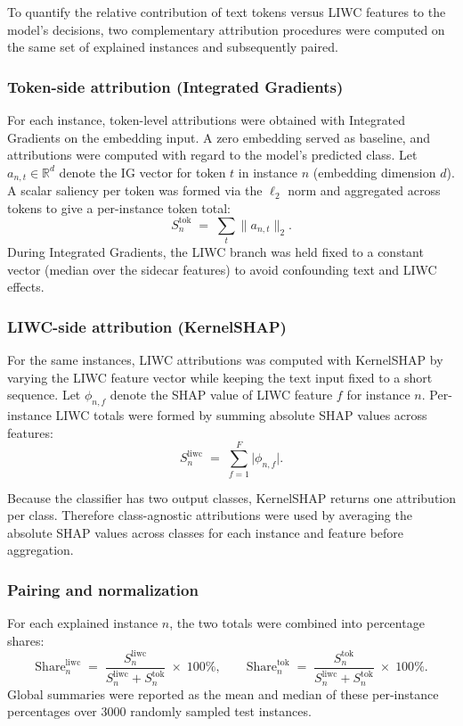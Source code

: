 To quantify the relative contribution of text tokens versus LIWC features to the model's decisions, two complementary attribution procedures were computed on the same set of explained instances and subsequently paired.

\subsubsection{Token-side attribution (Integrated Gradients)}

For each instance, token-level attributions were obtained with Integrated Gradients on the embedding input.
A zero embedding served as baseline, and attributions were computed with regard to the model's predicted class.
Let $a_{n,t}\in\mathbb{R}^d$ denote the IG vector for token $t$ in instance $n$ (embedding dimension $d$).
A scalar saliency per token was formed via the $\ell_2$ norm and aggregated across tokens to give a per-instance token total:
\[
S^{\mathrm{tok}}_{n}
\;=\;
\sum_{t} \lVert a_{n,t}\rVert_2.
\]
During Integrated Gradients, the LIWC branch was held fixed to a constant vector (median over the sidecar features) to avoid confounding text and LIWC effects.

\subsubsection{LIWC-side attribution (KernelSHAP)}

For the same instances, LIWC attributions was computed with KernelSHAP by varying the LIWC feature vector while keeping the text input fixed to a short sequence.
Let $\phi_{n,f}$ denote the SHAP value of LIWC feature $f$ for instance $n$.
Per-instance LIWC totals were formed by summing absolute SHAP values across features:
\[
S^{\mathrm{liwc}}_{n}
\;=\;
\sum_{f=1}^{F} \lvert \phi_{n,f}\rvert .
\]

Because the classifier has two output classes, KernelSHAP returns one attribution per class. Therefore class-agnostic attributions were used by averaging the absolute SHAP values across classes for each instance and feature before aggregation.

\subsubsection{Pairing and normalization}

For each explained instance \(n\), the two totals were combined into percentage shares:
\[
\mathrm{Share}^{\mathrm{liwc}}_{n}
\;=\;
\frac{S^{\mathrm{liwc}}_{n}}{S^{\mathrm{liwc}}_{n}+S^{\mathrm{tok}}_{n}}
\;\times\;100\%,
\qquad
\mathrm{Share}^{\mathrm{tok}}_{n}
\;=\;
\frac{S^{\mathrm{tok}}_{n}}{S^{\mathrm{liwc}}_{n}+S^{\mathrm{tok}}_{n}}
\;\times\;100\% .
\]
Global summaries were reported as the mean and median of these per-instance percentages over 3000 randomly sampled test instances.

